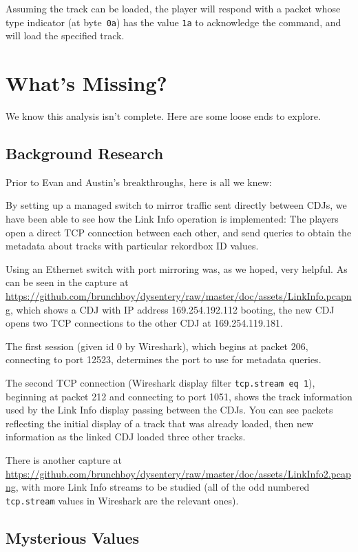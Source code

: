 \documentclass[11pt]{article}
\begin{document}
Assuming the track can be loaded, the player will respond with a
packet whose type indicator (at byte~{\tt 0a}) has the value {\tt 1a}
to acknowledge the command, and will load the specified track.

\section{What's Missing?}

We know this analysis isn't complete. Here are some loose ends to
explore.

\subsection{Background Research}

Prior to Evan and Austin's breakthroughs, here is all we knew:

By setting up a managed switch to mirror traffic sent directly between
CDJs, we have been able to see how the Link Info operation is
implemented: The players open a direct TCP connection between each
other, and send queries to obtain the metadata about tracks with
particular rekordbox ID values.

Using an Ethernet switch
with port mirroring was, as we hoped, very helpful. As can be seen in
the capture at
\url{https://github.com/brunchboy/dysentery/raw/master/doc/assets/LinkInfo.pcapng},
which shows a CDJ with IP address 169.254.192.112 booting, the new CDJ
opens two TCP connections to the other CDJ at 169.254.119.181.

The first session (given id 0 by Wireshark), which begins at packet
206, connecting to port 12523, determines the port to use for metadata
queries.

The second TCP connection (Wireshark display filter {\tt tcp.stream eq
  1}), beginning at packet 212 and connecting to port 1051, shows the
track information used by the Link Info display passing between the
CDJs. You can see packets reflecting the initial display of a track
that was already loaded, then new information as the linked CDJ loaded
three other tracks.

There is another capture at
\url{https://github.com/brunchboy/dysentery/raw/master/doc/assets/LinkInfo2.pcapng},
with more Link Info streams to be studied (all of the odd numbered
{\tt tcp.stream} values in Wireshark are the relevant ones).

\subsection{Mysterious Values}
\end{document}
